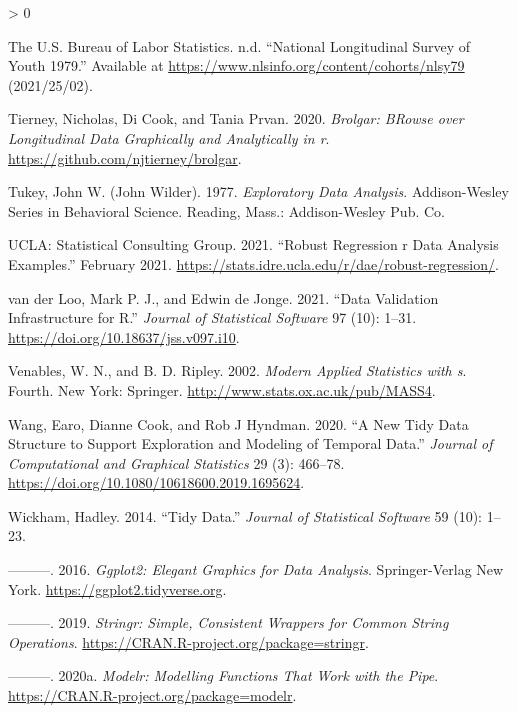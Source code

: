 \documentclass{article}
\newlength{\cslhangindent}
\newenvironment{CSLReferences}[2] %
 {%
  \setlength{\parindent}{0pt}
  \ifodd #1 \everypar{\setlength{\hangindent}{\cslhangindent}}\ignorespaces\fi
  \ifnum #2 > 0
  \setlength{\parskip}{#2\baselineskip}
  \fi
 }%
 {}
\begin{document}
\begin{CSLReferences}{1}{0}
\leavevmode\hypertarget{ref-nlsy79}{}%
The U.S. Bureau of Labor Statistics. n.d. {``National Longitudinal Survey of Youth 1979.''} Available at \url{https://www.nlsinfo.org/content/cohorts/nlsy79} (2021/25/02).

\leavevmode\hypertarget{ref-brolgar}{}%
Tierney, Nicholas, Di Cook, and Tania Prvan. 2020. \emph{Brolgar: BRowse over Longitudinal Data Graphically and Analytically in r}. \url{https://github.com/njtierney/brolgar}.

\leavevmode\hypertarget{ref-tukey}{}%
Tukey, John W. (John Wilder). 1977. \emph{Exploratory Data Analysis}. Addison-Wesley Series in Behavioral Science. Reading, Mass.: Addison-Wesley Pub. Co.

\leavevmode\hypertarget{ref-rlm}{}%
UCLA: Statistical Consulting Group. 2021. {``Robust Regression \textbar{} r Data Analysis Examples.''} February 2021. \url{https://stats.idre.ucla.edu/r/dae/robust-regression/}.

\leavevmode\hypertarget{ref-validate}{}%
van der Loo, Mark P. J., and Edwin de Jonge. 2021. {``Data Validation Infrastructure for {R}.''} \emph{Journal of Statistical Software} 97 (10): 1--31. \url{https://doi.org/10.18637/jss.v097.i10}.

\leavevmode\hypertarget{ref-mass}{}%
Venables, W. N., and B. D. Ripley. 2002. \emph{Modern Applied Statistics with s}. Fourth. New York: Springer. \url{http://www.stats.ox.ac.uk/pub/MASS4}.

\leavevmode\hypertarget{ref-tsibble}{}%
Wang, Earo, Dianne Cook, and Rob J Hyndman. 2020. {``A New Tidy Data Structure to Support Exploration and Modeling of Temporal Data.''} \emph{Journal of Computational and Graphical Statistics} 29 (3): 466--78. \url{https://doi.org/10.1080/10618600.2019.1695624}.

\leavevmode\hypertarget{ref-WickhamHadley2014TD}{}%
Wickham, Hadley. 2014. {``Tidy Data.''} \emph{Journal of Statistical Software} 59 (10): 1--23.

\leavevmode\hypertarget{ref-ggplot2}{}%
---------. 2016. \emph{Ggplot2: Elegant Graphics for Data Analysis}. Springer-Verlag New York. \url{https://ggplot2.tidyverse.org}.

\leavevmode\hypertarget{ref-stringr}{}%
---------. 2019. \emph{Stringr: Simple, Consistent Wrappers for Common String Operations}. \url{https://CRAN.R-project.org/package=stringr}.

\leavevmode\hypertarget{ref-modelr}{}%
---------. 2020a. \emph{Modelr: Modelling Functions That Work with the Pipe}. \url{https://CRAN.R-project.org/package=modelr}.


\end{CSLReferences}
\end{document}

